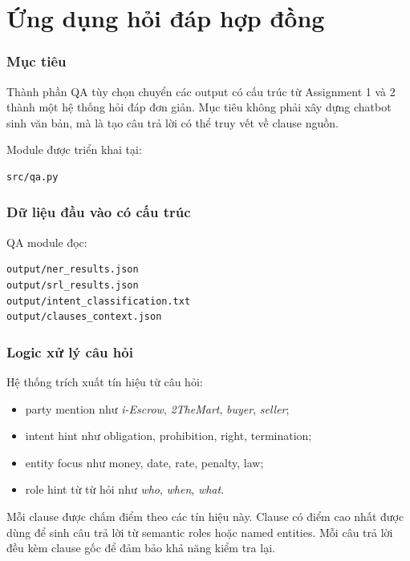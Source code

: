 \documentclass[oneside,final]{hcmut-report}
\begin{document}
\part{Ứng dụng hỏi đáp hợp đồng}
\label{assignment_3}

\section{Mục tiêu}
Thành phần QA tùy chọn chuyển các output có cấu trúc từ Assignment 1 và 2 thành một hệ thống hỏi đáp đơn giản. Mục tiêu không phải xây dựng chatbot sinh văn bản, mà là tạo câu trả lời có thể truy vết về clause nguồn.

Module được triển khai tại:

\begin{lstlisting}
src/qa.py
\end{lstlisting}

\section{Dữ liệu đầu vào có cấu trúc}
QA module đọc:

\begin{lstlisting}
output/ner_results.json
output/srl_results.json
output/intent_classification.txt
output/clauses_context.json
\end{lstlisting}

\section{Logic xử lý câu hỏi}
Hệ thống trích xuất tín hiệu từ câu hỏi:
\begin{itemize}
  \item party mention như \textit{i-Escrow}, \textit{2TheMart}, \textit{buyer}, \textit{seller};
  \item intent hint như obligation, prohibition, right, termination;
  \item entity focus như money, date, rate, penalty, law;
  \item role hint từ từ hỏi như \textit{who}, \textit{when}, \textit{what}.
\end{itemize}

Mỗi clause được chấm điểm theo các tín hiệu này. Clause có điểm cao nhất được dùng để sinh câu trả lời từ semantic roles hoặc named entities. Mỗi câu trả lời đều kèm clause gốc để đảm bảo khả năng kiểm tra lại.
\end{document}
